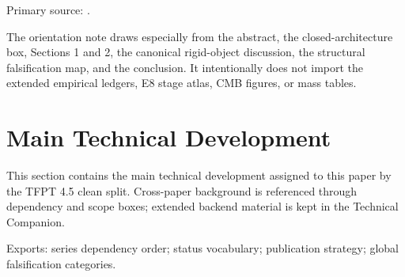 \documentclass[11pt,a4paper]{article}
\begin{document}
\begin{tfptsourcebox}
Primary source: \sourceDraft.

The orientation note draws especially from the abstract, the closed-architecture box, Sections 1
and 2, the canonical rigid-object discussion, the structural falsification map, and the conclusion.
It intentionally does not import the extended empirical ledgers, E8 stage atlas, CMB figures, or
mass tables.
\end{tfptsourcebox}

\clearpage
\section{Main Technical Development}

This section contains the main technical development assigned to this paper by the TFPT 4.5 clean split. Cross-paper background is referenced through dependency and scope boxes; extended backend material is kept in the Technical Companion.




\begin{tfptexports}
Exports: series dependency order; status vocabulary; publication strategy; global falsification categories.
\end{tfptexports}
\end{document}
